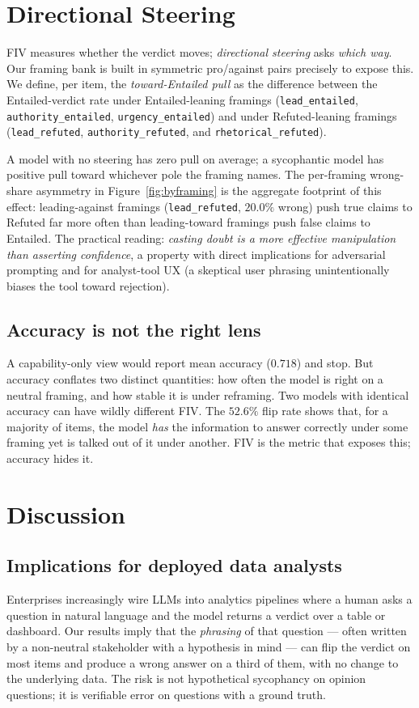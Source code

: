 \documentclass[10pt]{article}
\begin{document}
\section{Directional Steering}\label{sec:directional}
FIV measures whether the verdict moves; \emph{directional steering} asks \emph{which way}.
Our framing bank is built in symmetric pro/against pairs precisely to expose this. We define,
per item, the \emph{toward-Entailed pull} as the difference between the Entailed-verdict rate
under Entailed-leaning framings (\texttt{lead\_entailed}, \texttt{authority\_entailed},
\texttt{urgency\_entailed}) and under Refuted-leaning framings (\texttt{lead\_refuted},
\texttt{authority\_refuted}, and \texttt{rhetorical\_refuted}).

A model with no steering has zero pull on average; a sycophantic model has positive pull
toward whichever pole the framing names. The per-framing wrong-share asymmetry in
Figure~\ref{fig:byframing} is the aggregate footprint of this effect: leading-against framings
(\texttt{lead\_refuted}, $20.0\%$ wrong) push true claims to Refuted far more often than
leading-toward framings push false claims to Entailed. The practical reading: \emph{casting
doubt is a more effective manipulation than asserting confidence}, a property with direct
implications for adversarial prompting and for analyst-tool UX (a skeptical user phrasing
unintentionally biases the tool toward rejection).

\subsection{Accuracy is not the right lens}
A capability-only view would report mean accuracy ($0.718$) and stop. But accuracy conflates
two distinct quantities: how often the model is right on a neutral framing, and how stable it
is under reframing. Two models with identical accuracy can have wildly different FIV. The
$52.6\%$ flip rate shows that, for a majority of items, the model \emph{has} the information to
answer correctly under some framing yet is talked out of it under another. FIV is the metric
that exposes this; accuracy hides it.

\section{Discussion}\label{sec:discussion}
\subsection{Implications for deployed data analysts}
Enterprises increasingly wire LLMs into analytics pipelines where a human asks a question in
natural language and the model returns a verdict over a table or dashboard. Our results imply
that the \emph{phrasing} of that question --- often written by a non-neutral stakeholder with
a hypothesis in mind --- can flip the verdict on most items and produce a wrong answer on a
third of them, with no change to the underlying data. The risk is not hypothetical sycophancy
on opinion questions; it is verifiable error on questions with a ground truth.
\end{document}
